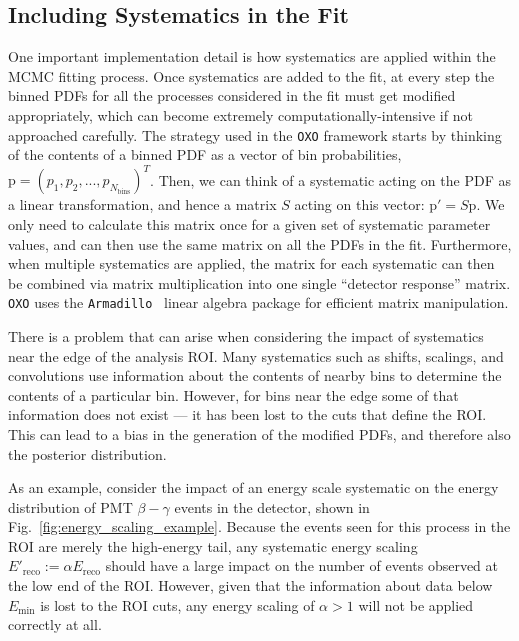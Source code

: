 \subsection{Including Systematics in the Fit}\label{sec:sys_in_fit_theory}
One important implementation detail is how systematics are applied within the MCMC fitting process. Once systematics are added to the fit, at every step the binned PDFs for all the processes considered in the fit must get modified appropriately, which can become extremely computationally-intensive if not approached carefully. The strategy used in the \texttt{OXO} framework starts by thinking of the contents of a binned PDF as a vector of bin probabilities, $\bm{\mathrm{p}} = \left(p_{1}, p_{2}, ..., p_{N_{\textrm{bins}}}\right)^{T}$. Then, we can think of a systematic acting on the PDF as a linear transformation, and hence a matrix $S$ acting on this vector: $\bm{\mathrm{p}'} = S\bm{\mathrm{p}}$. We only need to calculate this matrix once for a given set of systematic parameter values, and can then use the same matrix on all the PDFs in the fit. Furthermore, when multiple systematics are applied, the matrix for each systematic can then be combined via matrix multiplication into one single ``detector response'' matrix. \texttt{OXO} uses the \texttt{Armadillo}~\cite{sandersonArmadilloTemplatebasedLibrary2016,sandersonUserFriendlyHybridSparse2018} %
linear algebra package for efficient matrix manipulation.

There is a problem that can arise when considering the impact of systematics near the edge of the analysis ROI. Many systematics such as shifts, scalings, and convolutions use information about the contents of nearby bins to determine the contents of a particular bin. However, for bins near the edge some of that information does not exist --- it has been lost to the cuts that define the ROI. This can lead to a bias in the generation of the modified PDFs, and therefore also the posterior distribution.

As an example, consider the impact of an energy scale systematic on the energy distribution of PMT $\beta-\gamma$ events in the detector, shown in Fig.~\ref{fig:energy_scaling_example}. Because the events seen for this process in the ROI are merely the high-energy tail, any systematic energy scaling $E'_{\textrm{reco}} := \alpha E_{\textrm{reco}}$ should have a large impact on the number of events observed at the low end of the ROI. However, given that the information about data below $E_{\textrm{min}}$ is lost to the ROI cuts, any energy scaling of $\alpha>1$ will not be applied correctly at all.


